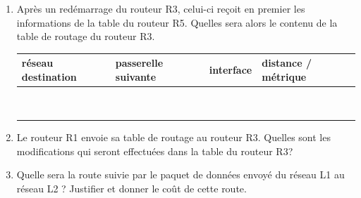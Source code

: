 \documentclass[11pt,a4paper]{article}
\newcounter{num}
\newcounter{rem}
\begin{document}
\begin{enumerate}
\item Après un redémarrage du routeur R3, celui-ci reçoit en premier les informations de la table du routeur R5. Quelles sera alors le contenu de la table de routage du routeur R3.

\begin{center}
\begin{tabular}{*{4}{|C{4cm}}|}\hline
\textbf{réseau destination} & \textbf{passerelle suivante} & \textbf{interface} & \textbf{distance / métrique} \\\hline
 & & & \\\hline
 & & & \\\hline
 & & & \\\hline
 & & & \\\hline
 & & & \\\hline
 & & & \\\hline
 & & & \\\hline
 & & & \\\hline
 & & & \\\hline
\end{tabular}
\end{center}

\item Le routeur R1 envoie sa table de routage au routeur R3. Quelles sont les modifications qui seront effectuées dans la table du routeur R3?

\vspace{2cm}

\item Quelle sera la route suivie par le paquet de données envoyé du réseau L1 au réseau L2 ? Justifier et donner le coût de cette route.



\end{enumerate}
%
%
%
\end{document}
